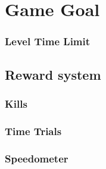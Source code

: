 \documentclass[../Main.tex]{subfiles}
\begin{document}
\section{Game Goal}

\subsubsection{Level Time Limit}



\subsection{Reward system}

\subsubsection{Kills}

\subsubsection{Time Trials}

\subsubsection{Speedometer}
\end{document}
